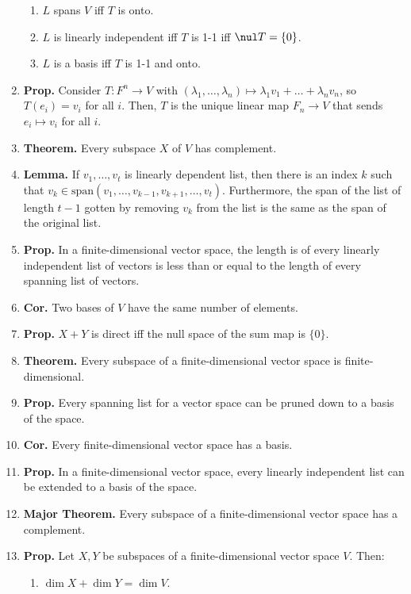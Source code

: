 \begin{enumerate}
    \begin{enumerate}
        \item $L$ spans $V$ iff $T$ is onto. 
        \item $L$ is linearly independent iff $T$ is 1-1 iff $\nul T = \{0\}$. 
        \item $L$ is a basis iff $T$ is 1-1 and onto. 
    \end{enumerate}
    \item \textbf{Prop. } Consider $T: F^n \to V$ with $(\lambda_1,\dots,\lambda_n) \mapsto \lambda_1v_1 + \dots + \lambda_nv_n$, so $T(e_i)=v_i$ for all $i$. Then, $T$ is the unique linear map $F_n \to V$ that sends $e_i \mapsto v_i$ for all $i$. 
    \item \textbf{Theorem. } Every subspace $X$ of $V$ has complement. 
	\item \textbf{Lemma. } If $v_1,\dots,v_t$ is linearly dependent list, then there is an index $k$ such that $v_k \in \textrm{span}(v_1,\dots,v_{k-1},v_{k+1},\dots,v_t)$. Furthermore, the span of the list of length $t-1$ gotten by removing $v_k$ from the list is the same as the span of the original list. 
	\item \textbf{Prop. } In a finite-dimensional vector space, the length is of every linearly independent list of vectors is less than or equal to the length of every spanning list of vectors. 
	\item \textbf{Cor. } Two bases of $V$ have the same number of elements. 
	\item \textbf{Prop. } $X+Y$ is direct iff the null space of the sum map is $\{0\}$. 
	\item \textbf{Theorem. } Every subspace of a finite-dimensional vector space is finite-dimensional. 
	\item \textbf{Prop. } Every spanning list for a vector space can be pruned down to a basis of the space. 
	\item \textbf{Cor. } Every finite-dimensional vector space has a basis. 
	\item \textbf{Prop. } In a finite-dimensional vector space, every linearly independent list can be extended to a basis of the space. 
	\item \textbf{Major Theorem. } Every subspace of a finite-dimensional vector space has a complement. 
	\item \textbf{Prop. } Let $X,Y$ be subspaces of a finite-dimensional vector space $V$. Then: 
	\begin{enumerate}
		\item $\dim X + \dim Y = \dim V$. 

\end{enumerate}
\end{enumerate}
